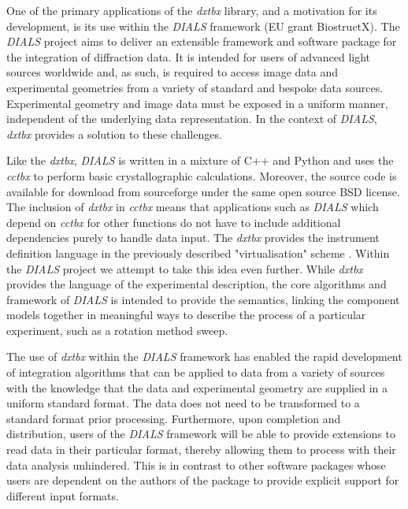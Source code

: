 \documentclass[preprint]{iucr}
\newcommand{\cctbx}{\emph{cctbx}\xspace}
\newcommand{\dxtbx}{\emph{dxtbx}\xspace}
\newcommand{\dials}{\emph{DIALS}\xspace}
\begin{document}
One of the primary applications of the \dxtbx library, and a motivation for its 
development, is its use within the \dials framework (EU grant BiostructX). The 
\dials project aims to deliver an extensible framework and software package for 
the integration of diffraction data. It is intended for users of advanced light 
sources worldwide and, as such, is required to access image data and 
experimental geometries from a variety of standard and bespoke data sources. 
Experimental geometry and image data must be exposed in a uniform manner, 
independent of the underlying data representation. In the context of \dials, 
\dxtbx provides a solution to these challenges. 

Like the \dxtbx, \dials is written in a mixture of C++ and Python and uses the 
\cctbx to perform basic crystallographic calculations. Moreover, the source code 
is available for download from sourceforge under the same open source BSD license. 
The inclusion of \dxtbx in \cctbx means that applications such as \dials which depend 
on \cctbx for other functions do not have to include additional dependencies purely 
to handle data input. The \dxtbx provides the instrument definition language in 
the previously described "virtualisation" scheme \cite{Bricogne1987}. Within the 
\dials project we attempt to take this idea even further. While \dxtbx provides the 
language of the experimental description, the core algorithms and framework of 
\dials is intended to provide the semantics, linking the component models together 
in meaningful ways to describe the process of a particular experiment, such as a 
rotation method sweep. 

The use of \dxtbx within the \dials framework has enabled the rapid development of 
integration algorithms that can be applied to data from a variety of sources 
with the knowledge that the data and experimental geometry are supplied in a 
uniform standard format. The data does not need to be transformed to a standard 
format prior processing. Furthermore, upon completion and distribution, users of 
the \dials framework will be able to provide extensions to read data in their 
particular format, thereby allowing them to process with their data analysis 
unhindered. This is in contrast to other software packages whose users are 
dependent on the authors of the package to provide explicit support for different 
input formats.
\end{document}
